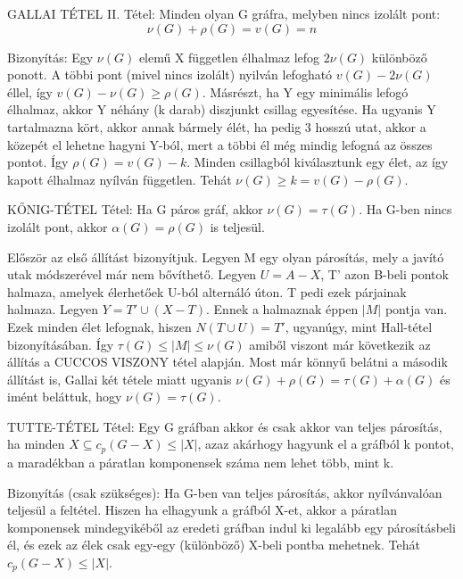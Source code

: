\documentclass[]{article}
\begin{document}
\begin{framed}
GALLAI TÉTEL II. Tétel: Minden olyan G gráfra, melyben nincs izolált pont:
$$\nu(G) + \rho(G) = v(G) = n$$
\end{framed}
\begin{leftbar}
Bizonyítás: Egy $\nu(G)$ elemű X független élhalmaz lefog $2\nu(G)$ különböző ponott. A többi pont (mivel nincs izolált) nyilván lefogható $v(G) - 2\nu(G)$ éllel, így $v(G) - \nu(G) \geq \rho(G)$. Másrészt, ha Y egy minimális lefogó élhalmaz, akkor Y néhány (k darab) diszjunkt csillag egyesítése. Ha ugyanis Y tartalmazna kört, akkor annak bármely élét, ha pedig 3 hosszú utat, akkor a közepét el lehetne hagyni Y-ból, mert a többi él még mindig lefogná az összes pontot. Így $\rho(G) = v(G) - k$. Minden csillagból kiválasztunk egy élet, az így kapott élhalmaz nyílván független. Tehát $\nu(G) \geq k = v(G) - \rho(G)$.
\end{leftbar}
\begin{framed}
KŐNIG-TÉTEL Tétel: Ha G páros gráf, akkor $\nu(G) = \tau(G)$. Ha G-ben nincs izolált pont, akkor $\alpha(G) = \rho(G)$ is teljesül.
\end{framed}
\begin{leftbar}
Először az első állítást bizonyítjuk. Legyen M egy olyan párosítás, mely a javító utak módszerével már nem bővíthető. Legyen $U = A - X$, T' azon B-beli pontok halmaza, amelyek élerhetőek U-ból alternáló úton. T pedi ezek párjainak halmaza. Legyen $Y = T' \cup (X - T)$. Ennek a halmaznak éppen $|M|$ pontja van. Ezek minden élet lefognak, hiszen $N(T\cup U) = T'$, ugyanúgy, mint Hall-tétel bizonyításában. Így $\tau(G) \leq |M| \leq \nu(G)$ amiből viszont már következik az állítás a CUCCOS VISZONY tétel alapján. Most már könnyű belátni a második állítást is, Gallai két tétele miatt ugyanis $\nu(G) + \rho(G) = \tau(G) + \alpha(G)$ és imént beláttuk, hogy $\nu(G) = \tau(G)$.
\end{leftbar}
\begin{framed}
TUTTE-TÉTEL Tétel: Egy G gráfban akkor és csak akkor van teljes párosítás, ha minden $X \subseteq c_p(G - X)\leq |X|$, azaz akárhogy hagyunk el a gráfból k pontot, a maradékban a páratlan komponensek száma nem lehet több, mint k. 
\end{framed}
\begin{leftbar}
Bizonyítás (csak szükséges): Ha G-ben van teljes párosítás, akkor nyílvánvalóan teljesül a feltétel. Hiszen ha elhagyunk a gráfból X-et, akkor a páratlan komponensek mindegyikéből az eredeti gráfban indul ki legalább egy párosításbeli él, és ezek az élek csak egy-egy (különböző) X-beli pontba mehetnek. Tehát $c_p(G - X) \leq |X|$.
\end{leftbar}
\end{document}
